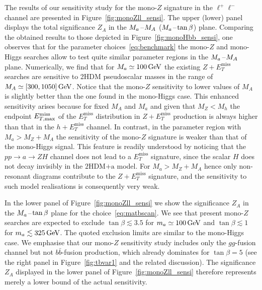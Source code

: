 \documentclass[a4paper, 11pt,notoc]{article}
\newcommand{\MET}{\ensuremath{E_T^\mathrm{miss}}\xspace}
\newcommand{\mA}{\ensuremath{M_{A}}\xspace}
\newcommand{\ma}{\ensuremath{M_{a}}\xspace}
\newcommand{\hdma}{\ensuremath{\textrm{2HDM+a}}\xspace}
\begin{document}
The results of our sensitivity study for the mono-$Z$ signature in the $\ell^+ \ell^-$ channel are presented in Figure~\ref{fig:monoZll_sensi}. The upper (lower) panel displays the total significance $Z_A$  in the $\ma\hspace{0.25mm}$--$\hspace{0.25mm}\mA$ ($\ma\hspace{0.25mm}$--$\hspace{0.25mm}\tan \beta$) plane. Comparing the obtained results to those depicted in Figure~\ref{fig:monoHbb_sensi}, one observes that for the parameter choices~\eqref{eq:benchmark} the mono-$Z$ and mono-Higgs searches allow to test quite similar parameter regions in the $\ma\hspace{0.25mm}$--$\hspace{0.25mm}\mA$ plane. Numerically, we find  that for $\ma \simeq 100 \, {\rm GeV}$  the existing $Z + \MET$ searches are sensitive to 2HDM pseudoscalar masses  in the range of $\mA \simeq [300, 1050] \, {\rm GeV}$. Notice that the mono-$Z$ sensitivity to lower values of $M_A$ is slightly better than the one found in the mono-Higgs case. This enhanced sensitivity arises because for fixed $M_A$ and $M_a$ and given that $M_Z < M_h$ the endpoint $E_{T, \rm max}^{\rm miss}$ of the $\MET$ distribution in $Z+ \MET$ production is always higher  than that in  the $h+ \MET$ channel. In contrast, in the parameter region with $M_a > M_Z + M_A$ the sensitivity of the mono-$Z$ signature is weaker than that of the mono-Higgs  signal. This feature is readily understood by noticing that the $pp \to a \to Z H$ channel does not lead to a $\MET$ signature, since the scalar $H$ does not decay invisibly in the \hdma model. For $M_a > M_Z + M_A$ hence only non-resonant diagrams contribute to the $Z+\MET$ signature, and the sensitivity to such model realisations is consequently very weak. 

{\color{red} In the lower panel of Figure~\ref{fig:monoZll_sensi} we show the significance $Z_A$ in the $\ma\hspace{0.25mm}$--$\hspace{0.25mm}\tan \beta$ plane for the choice~\eqref{eq:matbscan}.}   We see that present mono-$Z$ searches are expected to exclude $\tan \beta \lesssim 3.5$ for $m_a \simeq 100 \, {\rm GeV}$ and $\tan \beta \lesssim 1$ for $m_a \lesssim 325 \, {\rm GeV}$. The quoted exclusion limits are similar to  the mono-Higgs case. {\color{red} We emphasise that our mono-$Z$ sensitivity study includes only the $gg$-fusion channel but not $b \bar b$-fusion production, which already dominates for  $\tan \beta = 5$ (see the right  panel in Figure~\ref{fig:tbvar1} and the related discussion). The significance $Z_A$ displayed  in the lower panel of Figure~\ref{fig:monoZll_sensi}  therefore represents  merely a lower bound of the actual sensitivity.}
\end{document}

